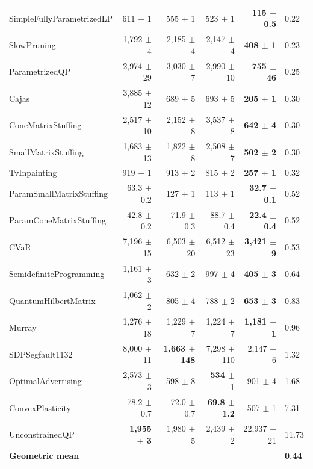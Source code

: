 \begin{table}[htbp]
{\begin{tabular}{l r r r r l}
SimpleFullyParametrizedLP   & 611 $\pm$ 1 & 555 $\pm$ 1 & 523 $\pm$ 1 & \textbf{115 $\pm$ 0.5} & 0.22 \\
SlowPruning                 & 1{,}792 $\pm$ 4 & 2{,}185 $\pm$ 4 & 2{,}147 $\pm$ 4 & \textbf{408 $\pm$ 1} & 0.23 \\
ParametrizedQP              & 2{,}974 $\pm$ 29 & 3{,}030 $\pm$ 7 & 2{,}990 $\pm$ 10 & \textbf{755 $\pm$ 46} & 0.25 \\
Cajas                       & 3{,}885 $\pm$ 12 & 689 $\pm$ 5 & 693 $\pm$ 5 & \textbf{205 $\pm$ 1} & 0.30 \\
ConeMatrixStuffing          & 2{,}517 $\pm$ 10 & 2{,}152 $\pm$ 8 & 3{,}537 $\pm$ 8 & \textbf{642 $\pm$ 4} & 0.30 \\
SmallMatrixStuffing         & 1{,}683 $\pm$ 13 & 1{,}822 $\pm$ 8 & 2{,}508 $\pm$ 7 & \textbf{502 $\pm$ 2} & 0.30 \\
TvInpainting                & 919 $\pm$ 1 & 913 $\pm$ 2 & 815 $\pm$ 2 & \textbf{257 $\pm$ 1} & 0.32 \\
ParamSmallMatrixStuffing    & 63.3 $\pm$ 0.2 & 127 $\pm$ 1 & 113 $\pm$ 1 & \textbf{32.7 $\pm$ 0.1} & 0.52 \\
ParamConeMatrixStuffing     & 42.8 $\pm$ 0.2 & 71.9 $\pm$ 0.3 & 88.7 $\pm$ 0.4 & \textbf{22.4 $\pm$ 0.4} & 0.52 \\
CVaR                        & 7{,}196 $\pm$ 15 & 6{,}503 $\pm$ 20 & 6{,}512 $\pm$ 23 & \textbf{3{,}421 $\pm$ 9} & 0.53 \\
SemidefiniteProgramming     & 1{,}161 $\pm$ 3 & 632 $\pm$ 2 & 997 $\pm$ 4 & \textbf{405 $\pm$ 3} & 0.64 \\
QuantumHilbertMatrix        & 1{,}062 $\pm$ 2 & 805 $\pm$ 4 & 788 $\pm$ 2 & \textbf{653 $\pm$ 3} & 0.83 \\
Murray                      & 1{,}276 $\pm$ 18 & 1{,}229 $\pm$ 7 & 1{,}224 $\pm$ 7 & \textbf{1{,}181 $\pm$ 1} & 0.96 \\
SDPSegfault1132             & 8{,}000 $\pm$ 11 & \textbf{1{,}663 $\pm$ 148} & 7{,}298 $\pm$ 110 & 2{,}147 $\pm$ 6 & 1.32 \\
OptimalAdvertising          & 2{,}573 $\pm$ 3 & 598 $\pm$ 8 & \textbf{534 $\pm$ 1} & 901 $\pm$ 4 & 1.68 \\
ConvexPlasticity            & 78.2 $\pm$ 0.7 & 72.0 $\pm$ 0.7 & \textbf{69.8 $\pm$ 1.2} & 507 $\pm$ 1 & 7.31 \\
UnconstrainedQP             & \textbf{1{,}955 $\pm$ 3} & 1{,}980 $\pm$ 5 & 2{,}439 $\pm$ 2 & 22{,}937 $\pm$ 21 & 11.73 \\
\midrule
\textbf{Geometric mean}     &       &       &       &       & \textbf{0.44} \\
\bottomrule
\end{tabular}}
\end{table}

